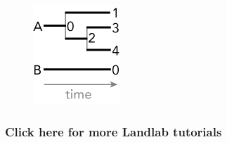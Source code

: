 \documentclass[11pt]{article}
\makeatletter
\def\maxwidth{\ifdim\Gin@nat@width>\linewidth\linewidth
    \else\Gin@nat@width\fi}
\let\Oldincludegraphics\includegraphics
\renewcommand{\includegraphics}[1]{\Oldincludegraphics[width=.8\maxwidth]{#1}}
\makeatother
\begin{document}
\begin{figure}
\centering
\includegraphics{images/species_number.png}
\caption{}
\end{figure}

    \subsubsection{Click here for more Landlab
tutorials}\label{click-here-for-more-landlab-tutorials}


    
    
    
    
\end{document}
